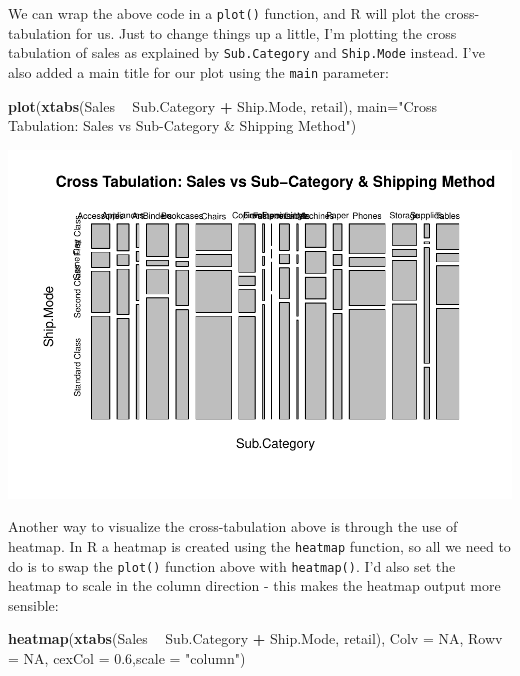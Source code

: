 \documentclass[]{article}
\newenvironment{Shaded}{\begin{snugshade}}{\end{snugshade}}
\newcommand{\DataTypeTok}[1]{\textcolor[rgb]{0.13,0.29,0.53}{#1}}
\newcommand{\FloatTok}[1]{\textcolor[rgb]{0.00,0.00,0.81}{#1}}
\newcommand{\KeywordTok}[1]{\textcolor[rgb]{0.13,0.29,0.53}{\textbf{#1}}}
\newcommand{\NormalTok}[1]{#1}
\newcommand{\OperatorTok}[1]{\textcolor[rgb]{0.81,0.36,0.00}{\textbf{#1}}}
\newcommand{\OtherTok}[1]{\textcolor[rgb]{0.56,0.35,0.01}{#1}}
\newcommand{\StringTok}[1]{\textcolor[rgb]{0.31,0.60,0.02}{#1}}
\begin{document}
We can wrap the above code in a \texttt{plot()} function, and R will
plot the cross-tabulation for us. Just to change things up a little, I'm
plotting the cross tabulation of sales as explained by
\texttt{Sub.Category} and \texttt{Ship.Mode} instead. I've also added a
main title for our plot using the \texttt{main} parameter:

\begin{Shaded}
\begin{Highlighting}[]
\KeywordTok{plot}\NormalTok{(}\KeywordTok{xtabs}\NormalTok{(Sales }\OperatorTok{~}\StringTok{ }\NormalTok{Sub.Category }\OperatorTok{+}\StringTok{ }\NormalTok{Ship.Mode, retail), }\DataTypeTok{main=}\StringTok{"Cross Tabulation: Sales vs Sub-Category & Shipping Method"}\NormalTok{)}
\end{Highlighting}
\end{Shaded}

\begin{center}\includegraphics{p4ds_files/figure-latex/unnamed-chunk-47-1} \end{center}

Another way to visualize the cross-tabulation above is through the use
of heatmap. In R a heatmap is created using the \texttt{heatmap}
function, so all we need to do is to swap the \texttt{plot()} function
above with \texttt{heatmap()}. I'd also set the heatmap to scale in the
column direction - this makes the heatmap output more sensible:

\begin{Shaded}
\begin{Highlighting}[]
\KeywordTok{heatmap}\NormalTok{(}\KeywordTok{xtabs}\NormalTok{(Sales }\OperatorTok{~}\StringTok{ }\NormalTok{Sub.Category }\OperatorTok{+}\StringTok{ }\NormalTok{Ship.Mode, retail), }\DataTypeTok{Colv =} \OtherTok{NA}\NormalTok{, }\DataTypeTok{Rowv =} \OtherTok{NA}\NormalTok{, }\DataTypeTok{cexCol =} \FloatTok{0.6}\NormalTok{,}\DataTypeTok{scale =} \StringTok{"column"}\NormalTok{)}
\end{Highlighting}
\end{Shaded}
\end{document}

